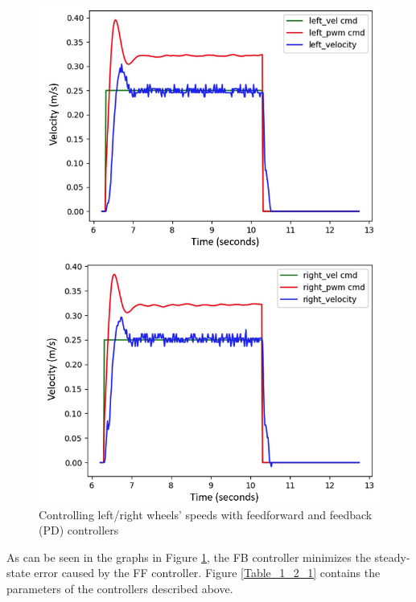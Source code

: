 \documentclass[journal]{IEEEtran}
\begin{document}
\begin{figure}[h]
\begin{center}
\includegraphics[width=0.81\linewidth]{image_1/figure_1_2_3.jpg}
\end{center}
   \caption{Controlling left/right wheels’ speeds with feedforward and feedback (PD) controllers}
	\label{figure_1_2_3}
\end{figure}


As can be seen in the graphs in Figure \ref{figure_1_2_3}, the FB controller minimizes the steady-state error caused by the FF controller. Figure \ref{Table_1_2_1} contains the parameters of the controllers described above. \\
\end{document}
